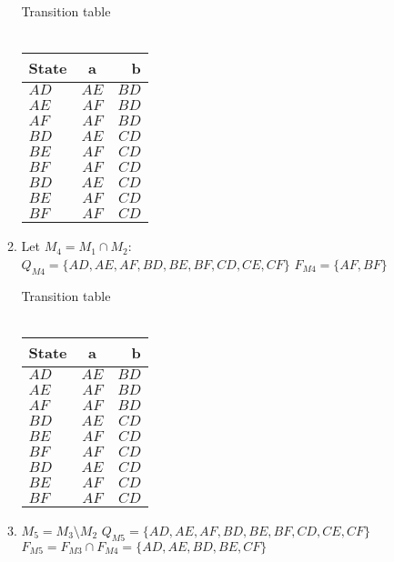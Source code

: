 \documentclass{article}
\begin{document}
\begin{enumerate}
\begin{enumerate}
          Transition table\\\\
          \begin{tabular}{ l | c | r }
            State & a & b \\ \hline
            $AD$ & $AE$ & $BD$ \\
            $AE$ & $AF$ & $BD$ \\
            $AF$ & $AF$ & $BD$ \\

            $BD$ & $AE$ & $CD$ \\
            $BE$ & $AF$ & $CD$ \\
            $BF$ & $AF$ & $CD$ \\

            $BD$ & $AE$ & $CD$ \\
            $BE$ & $AF$ & $CD$ \\
            $BF$ & $AF$ & $CD$ \\
          \end{tabular}
        \item Let $M_4 = M_1 \cap M_2$:\\
          $Q_{M4} = \{AD, AE, AF, BD, BE, BF, CD, CE, CF\}$
          $F_{M4} = \{AF, BF\}$
          
          Transition table\\\\
          \begin{tabular}{ l | c | r }
            State & a & b \\ \hline
            $AD$ & $AE$ & $BD$ \\
            $AE$ & $AF$ & $BD$ \\
            $AF$ & $AF$ & $BD$ \\

            $BD$ & $AE$ & $CD$ \\
            $BE$ & $AF$ & $CD$ \\
            $BF$ & $AF$ & $CD$ \\

            $BD$ & $AE$ & $CD$ \\
            $BE$ & $AF$ & $CD$ \\
            $BF$ & $AF$ & $CD$ \\
          \end{tabular}
        \item $M_5 = M_3 \setminus M_2$
          $Q_{M5} = \{AD, AE, AF, BD, BE, BF, CD, CE, CF\}$
          $F_{M5} = F_{M3} \cap F_{M4} = \{AD, AE, BD, BE, CF\}$


\end{enumerate}
\end{enumerate}
\end{document}
